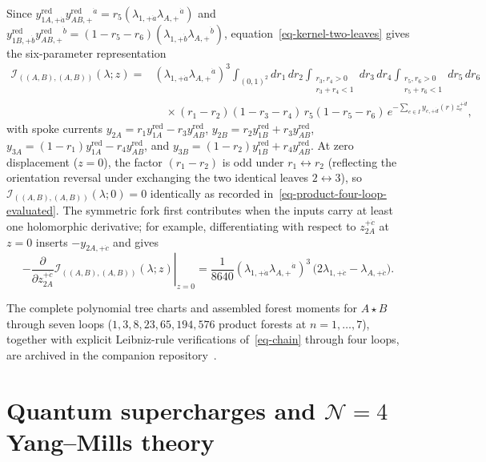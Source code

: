 \documentclass[11pt]{article}
\numberwithin{equation}{section}
\numberwithin{figure}{section}
\numberwithin{table}{section}
\begin{document}
\begin{enumerate}
Since $y_{1A,+\dot a}^{\mathrm{red}}y_{AB,+}^{\mathrm{red}}{}^{\dot a}=r_5(\lambda_{1,+\dot a}\lambda_{A,+}{}^{\dot a})$ and $y_{1B,+\dot b}^{\mathrm{red}}y_{AB,+}^{\mathrm{red}}{}^{\dot b}=(1-r_5-r_6)(\lambda_{1,+\dot b}\lambda_{A,+}{}^{\dot b})$, equation~\eqref{eq-kernel-two-leaves} gives the six-parameter representation
\begin{equation}\label{eq-ch7-fork-kernel}
\begin{aligned}
\mathcal I_{((A,B),(A,B))}(\lambda;z)
={}&(\lambda_{1,+\dot a}\lambda_{A,+}{}^{\dot a})^3
\int_{(0,1)^2}dr_1\,dr_2
\int_{\substack{r_3,r_4>0\\r_3+r_4<1}}dr_3\,dr_4
\int_{\substack{r_5,r_6>0\\r_5+r_6<1}}dr_5\,dr_6\\
&\quad\times (r_1-r_2)(1-r_3-r_4)\,r_5(1-r_5-r_6)\,
e^{-\sum_{e\in I}y_{e,+\dot d}(r)z_e^{+\dot d}},
\end{aligned}
\end{equation}
with spoke currents $y_{2A}=r_1y_{1A}^{\mathrm{red}}-r_3y_{AB}^{\mathrm{red}}$, $y_{2B}=r_2y_{1B}^{\mathrm{red}}+r_3y_{AB}^{\mathrm{red}}$, $y_{3A}=(1-r_1)y_{1A}^{\mathrm{red}}-r_4y_{AB}^{\mathrm{red}}$, and $y_{3B}=(1-r_2)y_{1B}^{\mathrm{red}}+r_4y_{AB}^{\mathrm{red}}$. At zero displacement ($z=0$), the factor $(r_1-r_2)$ is odd under $r_1\leftrightarrow r_2$ (reflecting the orientation reversal under exchanging the two identical leaves $2\leftrightarrow 3$), so $\mathcal I_{((A,B),(A,B))}(\lambda;0)=0$ identically as recorded in~\eqref{eq-product-four-loop-evaluated}. The symmetric fork first contributes when the inputs carry at least one holomorphic derivative; for example, differentiating with respect to $z_{2A}^{+\dot c}$ at $z=0$ inserts $-y_{2A,+\dot c}$ and gives
\begin{equation}\label{eq-ch7-fork-first-jet}
\left.-\frac{\partial}{\partial z_{2A}^{+\dot c}}
\mathcal I_{((A,B),(A,B))}(\lambda;z)\right|_{z=0}
=\frac{1}{8640}(\lambda_{1,+\dot a}\lambda_{A,+}{}^{\dot a})^3\,
\bigl(2\lambda_{1,+\dot c}-\lambda_{A,+\dot c}\bigr).
\end{equation}
\end{enumerate}
The complete polynomial tree charts and assembled forest moments for $A\star B$ through seven loops ($1,3,8,23,65,194,576$ product forests at $n=1,\ldots,7$), together with explicit Leibniz-rule verifications of~\eqref{eq-chain} through four loops, are archived in the companion repository~\cite{KernelRepo}.

\section{Quantum supercharges and \texorpdfstring{$\mathcal N=4$}{N=4} Yang--Mills theory}\label{sec-supercharge}
\end{document}
